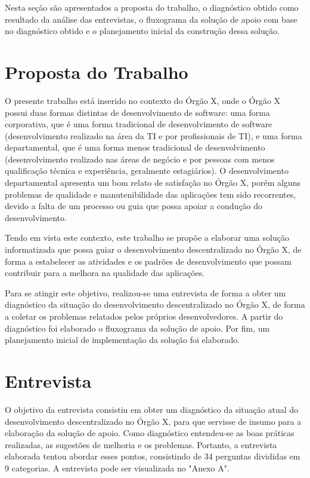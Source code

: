 Nesta seção são apresentados a proposta do trabalho, o diagnóstico obtido como resultado da análise das entrevistas, o fluxograma da solução de apoio com base no diagnóstico obtido e o planejamento inicial da construção dessa solução.

\section{Proposta do Trabalho}

O presente trabalho está inserido no contexto do Órgão X, onde o Órgão X possui duas formas distintas de desenvolvimento de software: uma forma corporativa, que é uma forma tradicional de desenvolvimento de software (desenvolvimento realizado na área da TI e por profissionais de TI), e uma forma departamental, que é uma forma menos tradicional de desenvolvimento (desenvolvimento realizado nas áreas de negócio e por pessoas com menos qualificação técnica e experiência, geralmente estagiários).
O desenvolvimento departamental apresenta um bom relato de satisfação no Órgão X, porém alguns problemas de qualidade e manutenibilidade das aplicações tem sido recorrentes, devido a falta de um processo ou guia que possa apoiar a condução do desenvolvimento.

Tendo em vista este contexto, este trabalho se propõe a elaborar uma solução informatizada que possa guiar o desenvolvimento descentralizado no Órgão X, de forma a estabelecer as atividades e os padrões de desenvolvimento que possam contribuir para a melhora na qualidade das aplicações.

Para se atingir este objetivo, realizou-se uma entrevista de forma a obter um diagnóstico da situação do desenvolvimento descentralizado no Órgão X, de forma a coletar os problemas relatados pelos próprios desenvolvedores. A partir do diagnóstico foi elaborado o fluxograma da solução de apoio. Por fim, um planejamento inicial de implementação da solução foi elaborado.

\section{Entrevista}

O objetivo da entrevista consistiu em obter um diagnóstico da situação atual do desenvolvimento descentralizado no Órgão X, para que servisse de insumo para a elaboração da solução de apoio. Como diagnóstico entendeu-se as boas práticas realizadas, as sugestões de melhoria e os problemas. Portanto, a entrevista elaborada tentou abordar esses pontos, consistindo de 34 perguntas divididas em 9 categorias. A entrevista pode ser visualizada no "Anexo A".

